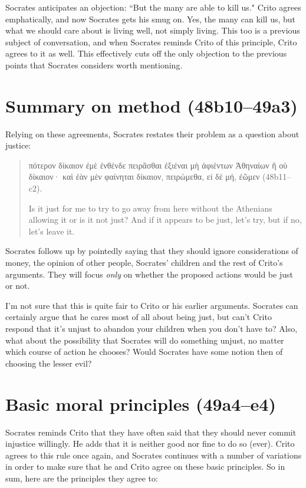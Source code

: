 \documentclass[11pt]{article}
\begin{document}
Socrates anticipates an objection: ``But the many are able to kill us." Crito agrees emphatically, and now Socrates gets his smug on. Yes, the many can kill us, but what we should care about is living well, not simply living.  This too is a previous subject of conversation, and when Socrates reminds Crito of this principle, Crito agrees to it as well.  This effectively cuts off the only objection to the previous points that Socrates considers worth mentioning.

\section{Summary on method (48b10--49a3)}

Relying on these agreements, Socrates restates their problem as a question about justice:

\begin{quote}
    πότερον δίκαιον ἐμὲ ἐνθένδε πειρᾶσθαι ἐξιέναι μὴ ἀφιέντων Ἀθηναίων ἢ οὐ δίκαιον· καὶ ἐὰν μὲν φαίνηται δίκαιον, πειρώμεθα, εἰ δὲ μή, ἐῶμεν (48b11--c2).

    Is it just for me to try to go away from here without the Athenians allowing it or is it not just? And if it appears to be just, let's try, but if no, let's leave it.
\end{quote}

Socrates follows up by pointedly saying that they should ignore considerations of money, the opinion of other people, Socrates' children and the rest of Crito's arguments.  They will focus \emph{only} on whether the proposed actions would be just or not.

I'm not sure that this is quite fair to Crito or his earlier arguments.  Socrates can certainly argue that he cares most of all about being just, but can't Crito respond that it's unjust to abandon your children when you don't have to?  Also, what about the possibility that Socrates will do something unjust, no matter which course of action he chooses?  Would Socrates have some notion then of choosing the lesser evil?

\section{Basic moral principles (49a4--e4)}

Socrates reminds Crito that they have often said that they should never commit injustice willingly.  He adds that it is neither good nor fine to do so (ever).  Crito agrees to this rule once again, and Socrates continues with a number of variations in order to make sure that he and Crito agree on these basic principles.  So in sum, here are the principles they agree to:
\end{document}
